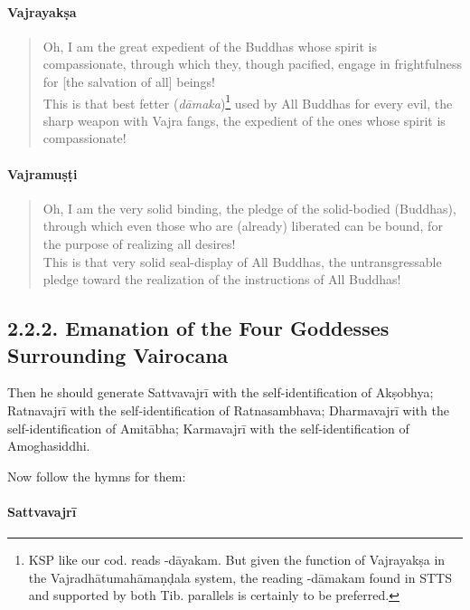 \documentclass[11pt]{book}
\newcommand{\skt}[1]{\emph{#1}}
\begin{document}
\paragraph{Vajrayakṣa}

\begin{verse}
Oh, I am the great expedient of the Buddhas whose spirit is compassionate, through which they, though pacified, engage in frightfulness for [the salvation of all] beings!\\
This is that best fetter (\skt{dāmaka})\footnote{KSP like our cod. reads -dāyakam. But given the function of Vajrayakṣa in the Vajradhātumahāmaṇḍala system, the reading -dāmakam found in STTS and supported by both Tib. parallels is certainly to be preferred.} used by All Buddhas for every evil, the sharp weapon with Vajra fangs, the expedient of the ones whose spirit is compassionate!
\end{verse}

\paragraph{Vajramuṣṭi}

\begin{verse}
Oh, I am the very solid binding, the pledge of the solid-bodied (Buddhas), through which even those who are (already) liberated can be bound, for the purpose of realizing all desires!\\
This is that very solid seal-display of All Buddhas, the untransgressable pledge toward the realization of the instructions of All Buddhas!
\end{verse}

\subsection{2.2.2. Emanation of the Four Goddesses Surrounding Vairocana}

Then he should generate Sattvavajrī with the self-identification of Akṣobhya; Ratnavajrī with the self-identification of Ratnasambhava; Dharmavajrī with the self-identification of Amitābha; Karmavajrī with the self-identification of Amoghasiddhi. 

Now follow the hymns for them:

\paragraph{Sattvavajrī}
\end{document}
